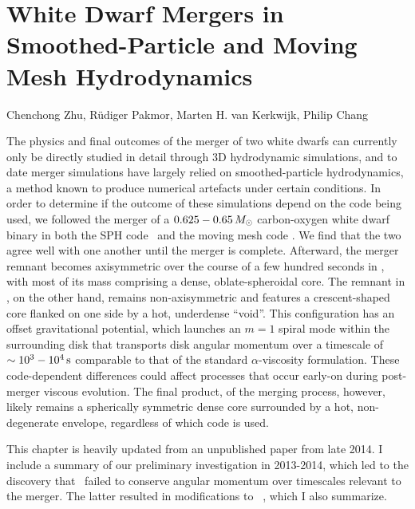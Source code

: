 \chapter{White Dwarf Mergers in Smoothed-Particle and Moving Mesh Hydrodynamics}

\begin{center}
\begin{minipage}[c]{4.75in}
Chenchong Zhu, R\"{u}diger Pakmor, Marten H. van Kerkwijk, Philip Chang\\
\vspace{2em}
\end{minipage}
\end{center}

The physics and final outcomes of the merger of two white dwarfs can currently only be directly studied in detail through 3D hydrodynamic simulations, and to date merger simulations have largely relied on smoothed-particle hydrodynamics, a method known to produce numerical artefacts under certain conditions.  In order to determine if the outcome of these simulations depend on the code being used, we followed the merger of a $0.625 - 0.65\,\Msun$ carbon-oxygen white dwarf binary in both the SPH code \gasoline\ and the moving mesh code \arepo.  We find that the two agree well with one another until the merger is complete.  Afterward, the merger remnant becomes axisymmetric over the course of a few hundred seconds in \gasoline, with most of its mass comprising a dense, oblate-spheroidal core.  The remnant in \arepo, on the other hand, remains non-axisymmetric and features a crescent-shaped core flanked on one side by a hot, underdense ``void''.  This configuration has an offset gravitational potential, which launches an $m = 1$ spiral mode within the surrounding disk that transports disk angular momentum over a timescale of $\sim10^3-10^4\,\mathrm{s}$ comparable to that of the standard $\alpha$-viscosity formulation.  These code-dependent differences could affect processes that occur early-on during post-merger viscous evolution.  The final product, of the merging process, however, likely remains a spherically symmetric dense core surrounded by a hot, non-degenerate envelope, regardless of which code is used.

This chapter is heavily updated from an unpublished paper from late 2014.  I include a summary of our preliminary investigation in 2013-2014, which led to the discovery that \arepo\ failed to conserve angular momentum over timescales relevant to the merger.  The latter resulted in modifications to \arepo\ \citep{pakm+16}, which I also summarize.


